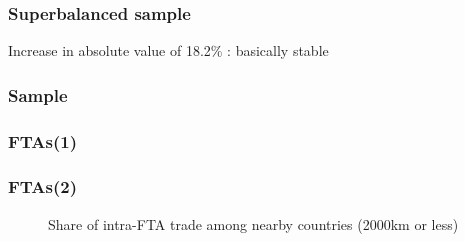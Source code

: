 \documentclass{beamer}
\begin{document}
\begin{frame}[plain]\frametitle{Superbalanced sample}
	\begin{figure}[h!]
		\begin{center}
			\setlength{\fboxrule}{1pt} %
			\setlength{\fboxsep}{.1in} %
		\end{center}
	\end{figure}
Increase in absolute value of 18.2\% : basically stable
\end{frame}



\begin{frame}[plain]\frametitle{Sample}
\begin{figure}[h!]
\begin{center}
\setlength{\fboxrule}{1pt} %
\setlength{\fboxsep}{.1in} %
\end{center}
\end{figure}
\end{frame}
\fi
\begin{frame}[plain]\frametitle{FTAs(1)}
\begin{figure}[h!]
\begin{center}
\setlength{\fboxrule}{1pt} %
\setlength{\fboxsep}{.1in} %
\end{center}
\end{figure}
\end{frame}

\begin{frame}[plain]\frametitle{FTAs(2)}
\begin{figure}[h!]
\caption{Share of intra-FTA trade among nearby countries (2000km or less)
\label{fig:ftascontig}}
\begin{center}
\setlength{\fboxrule}{1pt} %
\setlength{\fboxsep}{.1in} %
\end{center}
\end{figure}
\end{frame}
\end{document}
